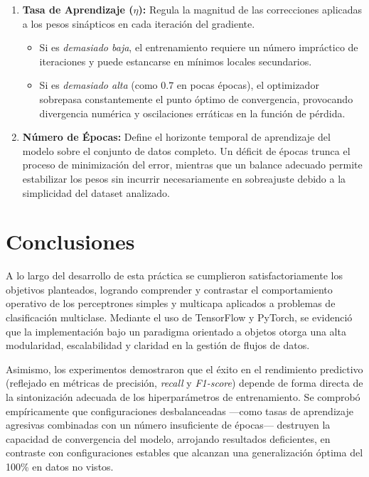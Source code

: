 \documentclass[12pt]{article}
\begin{document}
	\begin{enumerate}
		\item \textbf{Tasa de Aprendizaje ($\eta$):} Regula la magnitud de las correcciones aplicadas a los pesos sinápticos en cada iteración del gradiente. 
		\begin{itemize}
			\item Si es \textit{demasiado baja}, el entrenamiento requiere un número impráctico de iteraciones y puede estancarse en mínimos locales secundarios.
			\item Si es \textit{demasiado alta} (como $0.7$ en pocas épocas), el optimizador sobrepasa constantemente el punto óptimo de convergencia, provocando divergencia numérica y oscilaciones erráticas en la función de pérdida.
		\end{itemize}
		\item \textbf{Número de Épocas:} Define el horizonte temporal de aprendizaje del modelo sobre el conjunto de datos completo. Un déficit de épocas trunca el proceso de minimización del error, mientras que un balance adecuado permite estabilizar los pesos sin incurrir necesariamente en sobreajuste debido a la simplicidad del dataset analizado.
	\end{enumerate}
	
	\newpage
	\section{Conclusiones}	
	A lo largo del desarrollo de esta práctica se cumplieron satisfactoriamente los objetivos planteados, logrando comprender y contrastar el comportamiento operativo de los perceptrones simples y multicapa aplicados a problemas de clasificación multiclase. Mediante el uso de TensorFlow y PyTorch, se evidenció que la implementación bajo un paradigma orientado a objetos otorga una alta modularidad, escalabilidad y claridad en la gestión de flujos de datos.
	
	Asimismo, los experimentos demostraron que el éxito en el rendimiento predictivo (reflejado en métricas de precisión, \textit{recall} y \textit{F1-score}) depende de forma directa de la sintonización adecuada de los hiperparámetros de entrenamiento. Se comprobó empíricamente que configuraciones desbalanceadas —como tasas de aprendizaje agresivas combinadas con un número insuficiente de épocas— destruyen la capacidad de convergencia del modelo, arrojando resultados deficientes, en contraste con configuraciones estables que alcanzan una generalización óptima del 100\% en datos no vistos.
	
\end{document}
